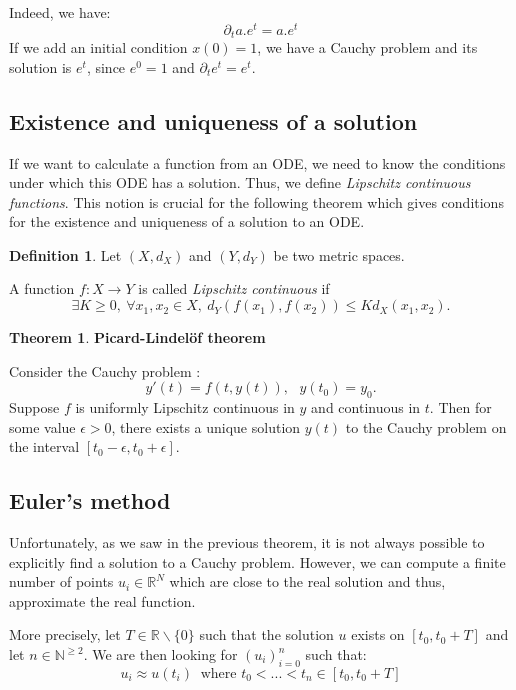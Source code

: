 \documentclass[10pt,a4paper]{article}
\theoremstyle{definition}
\newtheorem{definition}{Definition}
\theoremstyle{definition}
\newtheorem{theorem}{Theorem}
\theoremstyle{definition}
\begin{document}
Indeed, we have:
$$
\partial_t a.e^t = a.e^t
$$
If we add an initial condition $x(0) = 1$, we have a Cauchy problem and its solution is $e^t$, since $e^0 = 1$ and $\partial_te^t = e^t$.

\subsection{Existence and uniqueness of a solution}

If we want to calculate a function from an ODE, we need to know the conditions under which this ODE has a solution. Thus, we define \textit{Lipschitz continuous functions}. This notion is crucial for the following theorem which gives conditions for the existence and uniqueness of a solution to an ODE.

\begin{definition}
Let $(X, d_X)$ and $(Y, d_Y)$ be two metric spaces.  

A function $f: X \rightarrow  Y$ is called \textit{Lipschitz continuous} if
$$
\exists K \geq 0, \  \forall x_1, x_2 \in X, \  d_Y(f(x_1), f(x_2)) \leq Kd_X(x_1, x_2).
$$
\end{definition}

\begin{theorem}{\textbf{Picard-Lindelöf theorem}}

Consider the Cauchy problem :
$$
y'(t) = f(t, y(t)), \ \ \ y(t_0) = y_0.
$$
Suppose $f$ is uniformly Lipschitz continuous in $y$ and continuous in $t$. Then for some value $\epsilon > 0$, there exists a unique solution $y(t)$ to the Cauchy problem on the interval $[t_0 - \epsilon, t_0 + \epsilon]$. 
\end{theorem}

\subsection{Euler's method}
Unfortunately, as we saw in the previous theorem, it is not always possible to explicitly find a solution to a Cauchy problem. However, we can compute a finite number of points $u_i \in \mathbb{R}^N$ which are close to the real solution and thus, approximate the real function. 

More precisely, let $T \in \mathbb{R}\backslash\{0\}$ such that the solution $u$ exists on $[t_0, t_0 + T]$ and let $n \in \mathbb{N}^{\geqslant 2}$. We are then looking for $(u_i)^n_{i=0}$ such that:
$$
u_i \approx u(t_i) \ \text{ where } t_0 < ... < t_n \in [t_0, t_0 + T]
$$
\end{document}
